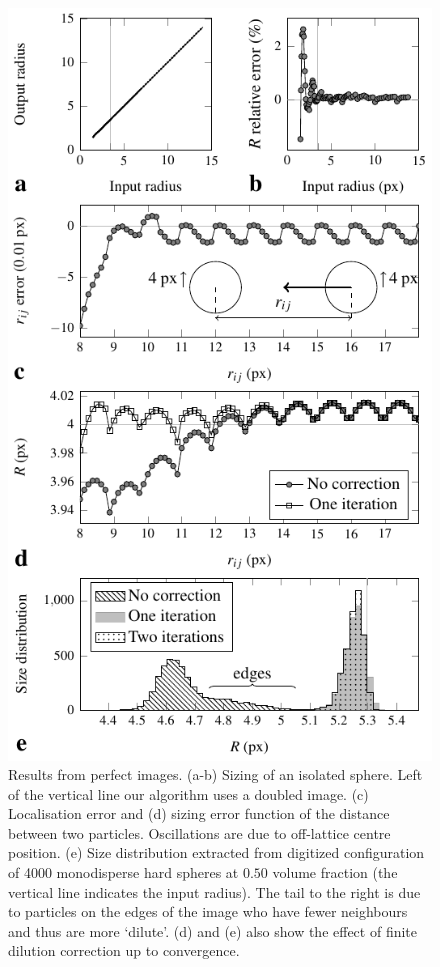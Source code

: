 \documentclass[8.5pt,twoside,twocolumn]{article}
\begin{document}
\begin{figure}
\centering
\includegraphics{fig_perfect.pdf}
	\caption{Results from perfect images. (a-b) Sizing of an isolated sphere. Left of the vertical line our algorithm uses a doubled image. (c) Localisation error and (d) sizing error function of the distance between two particles. Oscillations are due to off-lattice centre position. (e) Size distribution extracted from digitized configuration of 4000 monodisperse hard spheres at $0.50$ volume fraction (the vertical line indicates the input radius). The tail to the right is due to particles on the edges of the image who have fewer neighbours and thus are more `dilute'. (d) and (e) also show the effect of finite dilution correction up to convergence.}
	\label{fig:perfect}
\end{figure}
\end{document}
